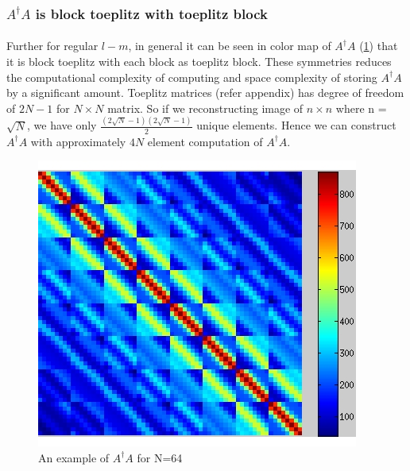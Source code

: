 \subsubsection{$A^\dagger A$ is block toeplitz with toeplitz block}

\paragraph{}Further for regular $l-m$, in general it can be seen in color map of $A^\dagger A$ (\ref{Figada}) that it is block toeplitz 
with each block as toeplitz block. These symmetries reduces the computational complexity of computing and space 
complexity of storing $A^\dagger A$ by a significant amount. Toeplitz matrices (refer appendix) has degree of freedom of $2N-1$ for 
$N \times N$ matrix. So if we reconstructing image of $n \times n$ where n = $\sqrt{N}$, we have only $\frac{(2 \sqrt{N}-1)(2 \sqrt{N}-1)}{2}$
unique elements. Hence we can construct $A^\dagger A$ with approximately $4N$ element computation of $A^\dagger A$.
\begin{figure}[!htbp]
  \begin{center}
      \includegraphics[width=\textwidth]{figures/ada}
    \caption{An example of $A^\dagger A$ for N=64 }
    \label{Figada}
  \end{center}
\end{figure}

